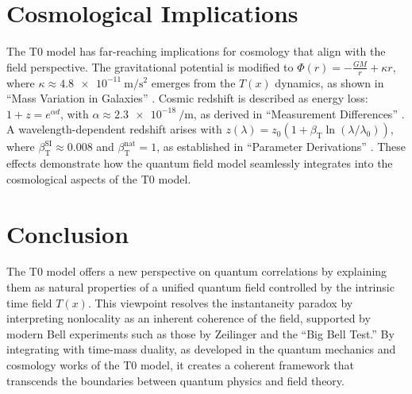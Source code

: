\documentclass[a4paper,12pt]{article}
\newcommand{\Tfield}{T(x)}
\newcommand{\betaT}{\beta_{\text{T}}}
\theoremstyle{definition}
\theoremstyle{remark}
\begin{document}
	\section{Cosmological Implications}
	
	The T0 model has far-reaching implications for cosmology that align with the field perspective. The gravitational potential is modified to \(\Phi(r) = -\frac{G M}{r} + \kappa r\), where \(\kappa \approx \SI{4.8e-11}{\meter\per\second\squared}\) emerges from the \(\Tfield\) dynamics, as shown in “Mass Variation in Galaxies” \cite{pascher_galaxies_2025}. Cosmic redshift is described as energy loss: \(1 + z = e^{\alpha d}\), with \(\alpha \approx \SI{2.3e-18}{\per\meter}\), as derived in “Measurement Differences” \cite{pascher_messdifferenzen_2025}. A wavelength-dependent redshift arises with \(z(\lambda) = z_0 (1 + \betaT \ln(\lambda/\lambda_0))\), where \(\betaT^{\text{SI}} \approx 0.008\) and \(\betaT^{\text{nat}} = 1\), as established in “Parameter Derivations” \cite{pascher_params_2025}. These effects demonstrate how the quantum field model seamlessly integrates into the cosmological aspects of the T0 model.
	
	\section{Conclusion}
	
	The T0 model offers a new perspective on quantum correlations by explaining them as natural properties of a unified quantum field controlled by the intrinsic time field \(\Tfield\). This viewpoint resolves the instantaneity paradox by interpreting nonlocality as an inherent coherence of the field, supported by modern Bell experiments such as those by Zeilinger and the “Big Bell Test.” By integrating with time-mass duality, as developed in the quantum mechanics and cosmology works of the T0 model, it creates a coherent framework that transcends the boundaries between quantum physics and field theory.
	
\end{document}
